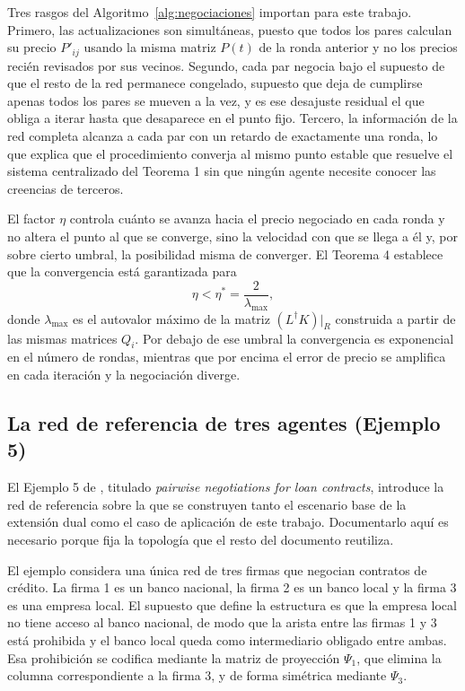 Tres rasgos del Algoritmo~\ref{alg:negociaciones} importan para este trabajo. Primero, las actualizaciones son simultáneas, puesto que todos los pares calculan su precio $P'_{ij}$ usando la misma matriz $P(t)$ de la ronda anterior y no los precios recién revisados por sus vecinos. Segundo, cada par negocia bajo el supuesto de que el resto de la red permanece congelado, supuesto que deja de cumplirse apenas todos los pares se mueven a la vez, y es ese desajuste residual el que obliga a iterar hasta que desaparece en el punto fijo. Tercero, la información de la red completa alcanza a cada par con un retardo de exactamente una ronda, lo que explica que el procedimiento converja al mismo punto estable que resuelve el sistema centralizado del Teorema 1 sin que ningún agente necesite conocer las creencias de terceros.

El factor $\eta$ controla cuánto se avanza hacia el precio negociado en cada ronda y no altera el punto al que se converge, sino la velocidad con que se llega a él y, por sobre cierto umbral, la posibilidad misma de converger. El Teorema 4 establece que la convergencia está garantizada para
\begin{equation}
\label{eq:eta}
    \eta < \eta^* = \frac{2}{\lambda_{\max}} ,
\end{equation}
donde $\lambda_{\max}$ es el autovalor máximo de la matriz $(L^\dagger K)|_R$ construida a partir de las mismas matrices $Q_i$. Por debajo de ese umbral la convergencia es exponencial en el número de rondas, mientras que por encima el error de precio se amplifica en cada iteración y la negociación diverge.

\subsection[La red de referencia de tres agentes]{La red de referencia de tres agentes (Ejemplo 5)}
\label{c24:ejemplo5}

El Ejemplo 5 de , titulado \textit{pairwise negotiations for loan contracts}, introduce la red de referencia sobre la que se construyen tanto el escenario base de la extensión dual como el caso de aplicación de este trabajo. Documentarlo aquí es necesario porque fija la topología que el resto del documento reutiliza.

El ejemplo considera una única red de tres firmas que negocian contratos de crédito. La firma 1 es un banco nacional, la firma 2 es un banco local y la firma 3 es una empresa local. El supuesto que define la estructura es que la empresa local no tiene acceso al banco nacional, de modo que la arista entre las firmas 1 y 3 está prohibida y el banco local queda como intermediario obligado entre ambas. Esa prohibición se codifica mediante la matriz de proyección $\Psi_1$, que elimina la columna correspondiente a la firma 3, y de forma simétrica mediante $\Psi_3$.

